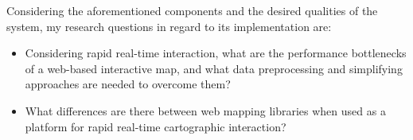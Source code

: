 

Considering the aforementioned components
and the desired qualities of the system,
my research questions in regard to its implementation are:

\begin{itemize}
	\item Considering rapid real-time interaction,
	what are the performance bottlenecks of
	a web-based interactive map,
	and what data preprocessing and simplifying approaches
	are needed to overcome them?
	\item What differences are there between web mapping libraries
	when used as a platform for rapid real-time cartographic interaction?
\end{itemize}  %






